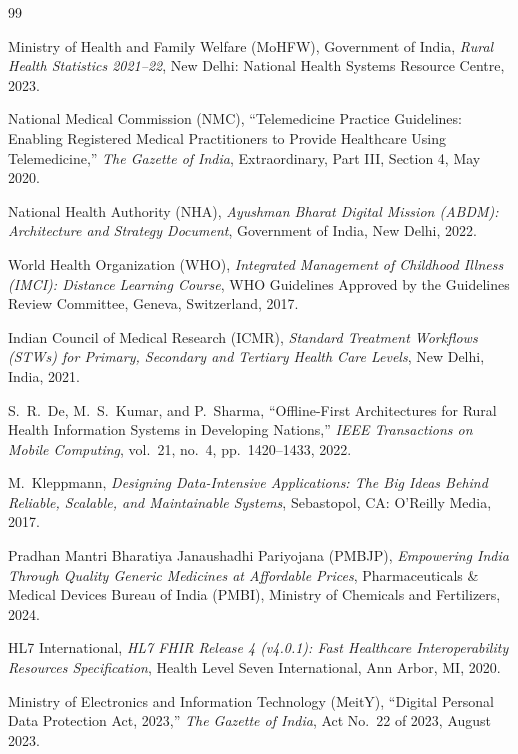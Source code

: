 \documentclass[12pt,a4paper,oneside]{report}
\begin{document}
\begin{thebibliography}{99}

Ministry of Health and Family Welfare (MoHFW), Government of India,
\emph{Rural Health Statistics 2021--22},
New Delhi: National Health Systems Resource Centre, 2023.

National Medical Commission (NMC),
``Telemedicine Practice Guidelines: Enabling Registered Medical Practitioners to Provide Healthcare Using Telemedicine,''
\emph{The Gazette of India}, Extraordinary, Part III, Section 4, May 2020.

National Health Authority (NHA),
\emph{Ayushman Bharat Digital Mission (ABDM): Architecture and Strategy Document},
Government of India, New Delhi, 2022.

World Health Organization (WHO),
\emph{Integrated Management of Childhood Illness (IMCI): Distance Learning Course},
WHO Guidelines Approved by the Guidelines Review Committee, Geneva, Switzerland, 2017.

Indian Council of Medical Research (ICMR),
\emph{Standard Treatment Workflows (STWs) for Primary, Secondary and Tertiary Health Care Levels},
New Delhi, India, 2021.

S.~R.~De, M.~S.~Kumar, and P.~Sharma,
``Offline-First Architectures for Rural Health Information Systems in Developing Nations,''
\emph{IEEE Transactions on Mobile Computing}, vol.~21, no.~4, pp.~1420--1433, 2022.

M.~Kleppmann,
\emph{Designing Data-Intensive Applications: The Big Ideas Behind Reliable, Scalable, and Maintainable Systems},
Sebastopol, CA: O'Reilly Media, 2017.

Pradhan Mantri Bharatiya Janaushadhi Pariyojana (PMBJP),
\emph{Empowering India Through Quality Generic Medicines at Affordable Prices},
Pharmaceuticals \& Medical Devices Bureau of India (PMBI), Ministry of Chemicals and Fertilizers, 2024.

HL7 International,
\emph{HL7 FHIR Release 4 (v4.0.1): Fast Healthcare Interoperability Resources Specification},
Health Level Seven International, Ann Arbor, MI, 2020.

Ministry of Electronics and Information Technology (MeitY),
``Digital Personal Data Protection Act, 2023,''
\emph{The Gazette of India}, Act No.~22 of 2023, August 2023.


\end{thebibliography}
\end{document}

